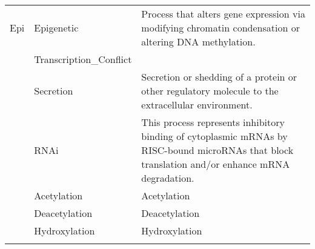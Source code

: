\documentclass{article}
\begin{document}
\begin{subtables}
\begin{longtable}[c]{@{}llp{}@{}}
{\footnotesize{}Epi}&Epigenetic&Process that alters gene expression via modifying chromatin condensation or altering DNA methylation.\\\addlinespace[\dimexpr0.75\defaultaddspace]
{\footnotesize{}TrConf}&Transcription\_{}Conflict&\\\addlinespace[\dimexpr0.75\defaultaddspace]
{\footnotesize{}Secr}&Secretion&Secretion or shedding of a protein or other regulatory molecule to the extracellular environment.\\\addlinespace[\dimexpr0.75\defaultaddspace]
{\footnotesize{}RNAi}&RNAi&This process represents inhibitory binding of cytoplasmic mRNAs by RISC-bound microRNAs that block translation and/or enhance mRNA degradation.\\\addlinespace[\dimexpr0.75\defaultaddspace]
{\footnotesize{}Acet}&Acetylation&Acetylation\\\addlinespace[\dimexpr0.75\defaultaddspace]
{\footnotesize{}Deacet}&Deacetylation&Deacetylation\\\addlinespace[\dimexpr0.75\defaultaddspace]
{\footnotesize{}-OH}&Hydroxylation&Hydroxylation\\
\bottomrule
\end{longtable}


\end{subtables}
\end{document}
